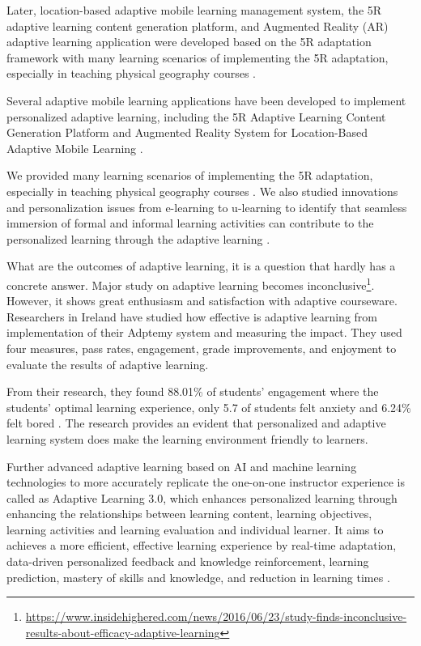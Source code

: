 \documentclass[english]{textolivre}
\begin{document}
Later, location-based adaptive mobile learning management system, the 5R adaptive learning content generation platform, and Augmented Reality (AR) adaptive learning application were developed based on the 5R adaptation framework with many learning scenarios of implementing the 5R adaptation, especially in teaching physical geography courses \cite{tan2011, ako-nai_location2013, ako-nai2012, tan2015, chang2010, tan2016}.

Several adaptive mobile learning applications have been developed to implement personalized adaptive learning, including the 5R Adaptive Learning Content Generation Platform and Augmented Reality System for Location-Based Adaptive Mobile Learning \cite{tan2010, tan2011, ako-nai_location2013}.

We provided many learning scenarios of implementing the 5R adaptation, especially in teaching physical geography courses \cite{ako-nai2012}. We also studied innovations and personalization issues from e-learning to u-learning to identify that seamless immersion of formal and informal learning activities can contribute to the personalized learning through the adaptive learning \cite{tan2015}.

What are the outcomes of adaptive learning, it is a question that hardly has a concrete answer. Major study on adaptive learning becomes inconclusive\footnote{\url{https://www.insidehighered.com/news/2016/06/23/study-finds-inconclusive-results-about-efficacy-adaptive-learning}}. However, it shows great enthusiasm and satisfaction with adaptive courseware. Researchers in Ireland have studied how effective is adaptive learning from implementation of their Adptemy system and measuring the impact. They used four measures, pass rates, engagement, grade improvements, and enjoyment to evaluate the results of adaptive learning.  

From their research, they found 88.01\% of students’ engagement where the students’ optimal learning experience, only 5.7 of students felt anxiety and 6.24\% felt bored \cite{lynch2017}. The research provides an evident that personalized and adaptive learning system does make the learning environment friendly to learners.

Further advanced adaptive learning based on AI and machine learning technologies to more accurately replicate the one-on-one instructor experience is called as Adaptive Learning 3.0, which enhances personalized learning through enhancing the relationships between learning content, learning objectives, learning activities and learning evaluation and individual learner. It aims to achieves a more efficient, effective learning experience by real-time adaptation, data-driven personalized feedback and knowledge reinforcement, learning prediction, mastery of skills and knowledge, and reduction in learning times \cite{weir2019}.
\end{document}
